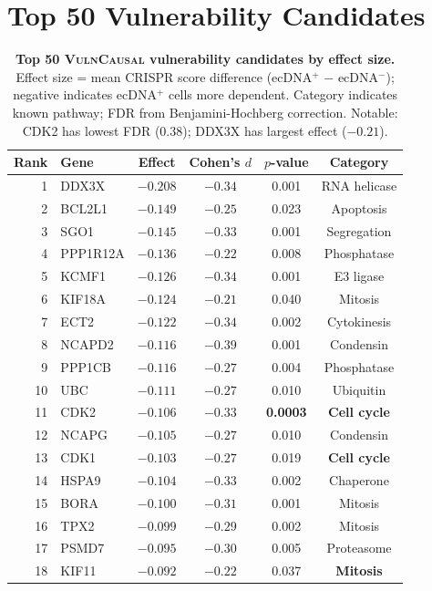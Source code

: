 \documentclass{article}
\newcommand{\vulncausal}{\textsc{VulnCausal}}
\begin{document}
\section{Top 50 Vulnerability Candidates}
\label{app:top_vulnerabilities}

\begin{table}[h]
\caption{\textbf{Top 50 \vulncausal{} vulnerability candidates by effect size.} Effect size = mean CRISPR score difference (ecDNA$^+$ $-$ ecDNA$^-$); negative indicates ecDNA$^+$ cells more dependent. Category indicates known pathway; FDR from Benjamini-Hochberg correction. Notable: CDK2 has lowest FDR (0.38); DDX3X has largest effect ($-0.21$).}
\label{tab:top_vuln}
\centering
\small
\begin{tabular}{@{}rlcccc@{}}
\toprule
Rank & Gene & Effect & Cohen's $d$ & $p$-value & Category \\
\midrule
1 & DDX3X & $-0.208$ & $-0.34$ & 0.001 & RNA helicase \\
2 & BCL2L1 & $-0.149$ & $-0.25$ & 0.023 & Apoptosis \\
3 & SGO1 & $-0.145$ & $-0.33$ & 0.001 & Segregation \\
4 & PPP1R12A & $-0.136$ & $-0.22$ & 0.008 & Phosphatase \\
5 & KCMF1 & $-0.126$ & $-0.34$ & 0.001 & E3 ligase \\
6 & KIF18A & $-0.124$ & $-0.21$ & 0.040 & Mitosis \\
7 & ECT2 & $-0.122$ & $-0.34$ & 0.002 & Cytokinesis \\
8 & NCAPD2 & $-0.116$ & $-0.39$ & 0.001 & Condensin \\
9 & PPP1CB & $-0.116$ & $-0.27$ & 0.004 & Phosphatase \\
10 & UBC & $-0.111$ & $-0.27$ & 0.010 & Ubiquitin \\
11 & CDK2 & $-0.106$ & $-0.33$ & \textbf{0.0003} & \textbf{Cell cycle} \\
12 & NCAPG & $-0.105$ & $-0.27$ & 0.010 & Condensin \\
13 & CDK1 & $-0.103$ & $-0.27$ & 0.019 & \textbf{Cell cycle} \\
14 & HSPA9 & $-0.104$ & $-0.33$ & 0.002 & Chaperone \\
15 & BORA & $-0.100$ & $-0.31$ & 0.001 & Mitosis \\
16 & TPX2 & $-0.099$ & $-0.29$ & 0.002 & Mitosis \\
17 & PSMD7 & $-0.095$ & $-0.30$ & 0.005 & Proteasome \\
18 & KIF11 & $-0.092$ & $-0.22$ & 0.037 & \textbf{Mitosis} \\

\end{tabular}
\end{table}
\end{document}
